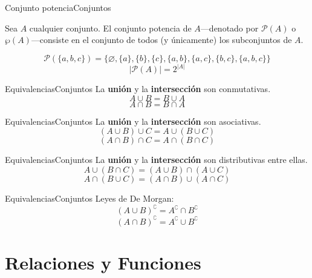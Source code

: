 \documentclass[spanish]{beamer}
\begin{document}
\begin{frame}{Conjunto potencia}{Conjuntos}
    \begin{definition}
        Sea $A$ cualquier conjunto. El \alert{conjunto potencia} de $A$---denotado por $\mathscr{P}(A)$ o $\wp(A)$---consiste en el conjunto de todos (y únicamente) los subconjuntos de $A$.
    \end{definition}
    \pause
    \bigskip
    \[\mathscr{P}(\{a,b,c\}) = \{\varnothing, \{a\}, \{b\}, \{c\}, \{a,b\}, \{a,c\}, \{b,c\}, \{a,b,c\}\}\] \pause
    \bigskip
    \[|\mathscr{P}(A)| = 2^{|A|}\]
\end{frame}

\begin{frame}{Equivalencias}{Conjuntos}
    La \textbf{unión} y la \textbf{intersección} son \alert{conmutativas}. \pause
    \bigskip
    \[A \cup B = B \cup A\] \pause
    \bigskip
    \[A \cap B = B \cap A\]
\end{frame}

\begin{frame}{Equivalencias}{Conjuntos}
    La \textbf{unión} y la \textbf{intersección} son \alert{asociativas}. \pause
    \bigskip
    \[(A \cup B) \cup C = A \cup (B \cup C)\] \pause
    \bigskip
    \[(A \cap B) \cap C = A \cap (B \cap C)\]
\end{frame}

\begin{frame}{Equivalencias}{Conjuntos}
    La \textbf{unión} y la \textbf{intersección} son \alert{distributivas} entre ellas. \pause
    \bigskip
    \[A \cup (B \cap C) = (A \cup B) \cap (A \cup C)\] \pause
    \bigskip
    \[A \cap (B \cup C) = (A \cap B) \cup (A \cap C)\]
\end{frame}

\begin{frame}{Equivalencias}{Conjuntos}
    Leyes de \alert{De Morgan}: \pause
    \bigskip
    \[(A \cup B)^\complement = A^\complement \cap B^\complement\] \pause
    \[(A \cap B)^\complement = A^\complement \cup B^\complement\]
\end{frame}

\section{Relaciones y Funciones}
\label{sec:relfunc}
\end{document}

